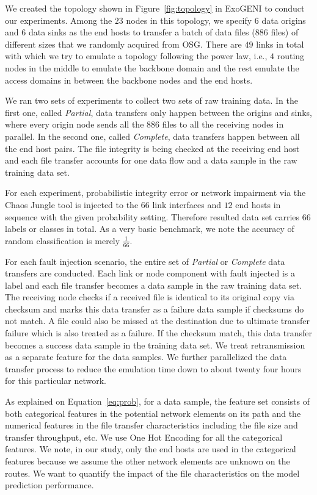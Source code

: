 We created the topology shown in Figure~\ref{fig:topology} in ExoGENI to conduct our experiments. Among the $23$ nodes in this topology, we specify $6$ data origins and $6$ data sinks as the end hosts to transfer a batch of data files ($886$ files) of different sizes that we randomly acquired from OSG. There are $49$ links in total with which we try to emulate a topology following the power law, i.e., $4$ routing nodes in the middle to emulate the backbone domain and the rest emulate the access domains in between the backbone nodes and the end hosts. 

We ran two sets of experiments to collect two sets of raw training data. In the first one, called {\it Partial},
data transfers only happen between the origins and sinks, where every origin node sends all the $886$ files 
to all the receiving nodes in parallel. In the second one, called {\it Complete}, data transfers happen between all the end host pairs. 
The file integrity is being checked at the receiving end host and each file transfer accounts for one data flow and a
 data sample in the raw training data set.

For each experiment, probabilistic integrity error or network impairment via the Chaos Jungle tool is injected to the $66$ link interfaces and $12$ end hosts in sequence with the given probability setting. Therefore resulted data set carries $66$ labels or classes in total. As a very basic benchmark, we note the accuracy of random classification is merely $\frac{1}{66}$.

For each fault injection scenario, the entire set of {\it Partial} or {\it Complete} data transfers are conducted. Each link or node component with fault injected is a label and each file transfer becomes a data sample in the raw training data set. The receiving node checks if a received file is identical to its original copy via checksum and marks this data transfer as a failure data sample if checksums do not match. A file could also be missed at the destination due to ultimate transfer failure which is also treated as a failure. If the checksum match, this data transfer becomes a success data sample in the training data set. We treat retransmission as a separate feature for the data samples. We further parallelized the data transfer process to reduce the emulation time down to about twenty four hours for this particular network. 

As explained on Equation~\ref{eq:prob}, for a data sample, the feature set consists of both categorical features in the potential network elements on its path and the numerical features 
in the file transfer characteristics including the file size and transfer throughput, etc. We use One Hot Encoding for all the categorical features. 
We note, in our study, only the end hosts are used in the categorical features because we assume the other network elements are unknown on the routes. 
We want to quantify the impact of the file characteristics on the model prediction performance. 

